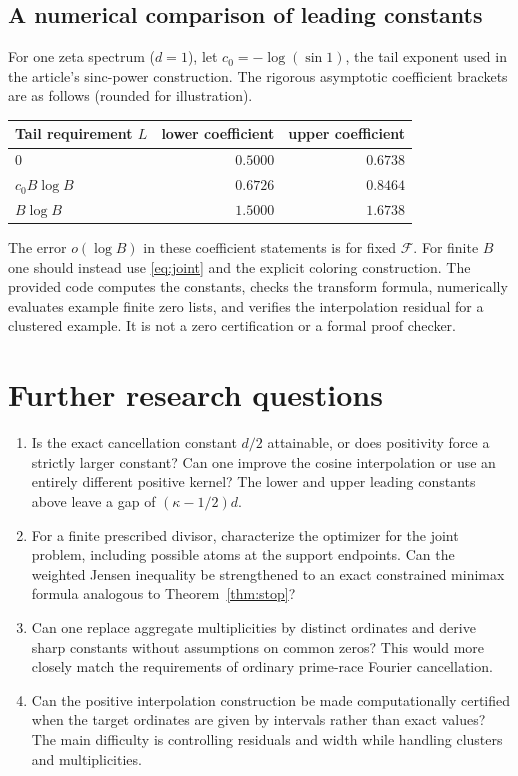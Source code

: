 \documentclass[11pt]{article}
\theoremstyle{remark}\newtheorem{remark}[theorem]{Remark}
\newcommand{\F}{\mathcal F}\newcommand{\dd}{\mathrm d}
\begin{document}
\subsection*{A numerical comparison of leading constants}
For one zeta spectrum ($d=1$), let $c_0=-\log(\sin1)$, the tail exponent used in the article's sinc-power construction. The rigorous asymptotic coefficient brackets are as follows (rounded for illustration).
\begin{center}
\begin{tabular}{@{}lrr@{}}
\toprule
Tail requirement $L$ & lower coefficient & upper coefficient\\\midrule
$0$ & $0.5000$ & $0.6738$\\
$c_0 B\log B$ & $0.6726$ & $0.8464$\\
$B\log B$ & $1.5000$ & $1.6738$\\
\bottomrule
\end{tabular}
\end{center}
The error $o(\log B)$ in these coefficient statements is for fixed $\F$. For finite $B$ one should instead use \eqref{eq:joint} and the explicit coloring construction. The provided code computes the constants, checks the transform formula, numerically evaluates example finite zero lists, and verifies the interpolation residual for a clustered example. It is not a zero certification or a formal proof checker.

\section{Further research questions}
\begin{enumerate}
\item Is the exact cancellation constant $d/2$ attainable, or does positivity force a strictly larger constant? Can one improve the cosine interpolation or use an entirely different positive kernel? The lower and upper leading constants above leave a gap of $(\kappa-1/2)d$.
\item For a finite prescribed divisor, characterize the optimizer for the joint problem, including possible atoms at the support endpoints. Can the weighted Jensen inequality be strengthened to an exact constrained minimax formula analogous to Theorem~\ref{thm:stop}?
\item Can one replace aggregate multiplicities by distinct ordinates and derive sharp constants without assumptions on common zeros? This would more closely match the requirements of ordinary prime-race Fourier cancellation.
\item Can the positive interpolation construction be made computationally certified when the target ordinates are given by intervals rather than exact values? The main difficulty is controlling residuals and width while handling clusters and multiplicities.
\end{enumerate}
\end{document}

